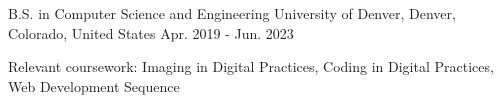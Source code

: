 

\begin{cventries}

  \cventry
    {B.S. in Computer Science and Engineering} %
    {University of Denver,} %
    {Denver, Colorado, United States} %
    {Apr. 2019 - Jun. 2023} %
    {
      \begin{cvitems} %
        \item {Relevant coursework: Imaging in Digital Practices, Coding in Digital Practices, Web Development Sequence}
      \end{cvitems}
    }

\end{cventries}
